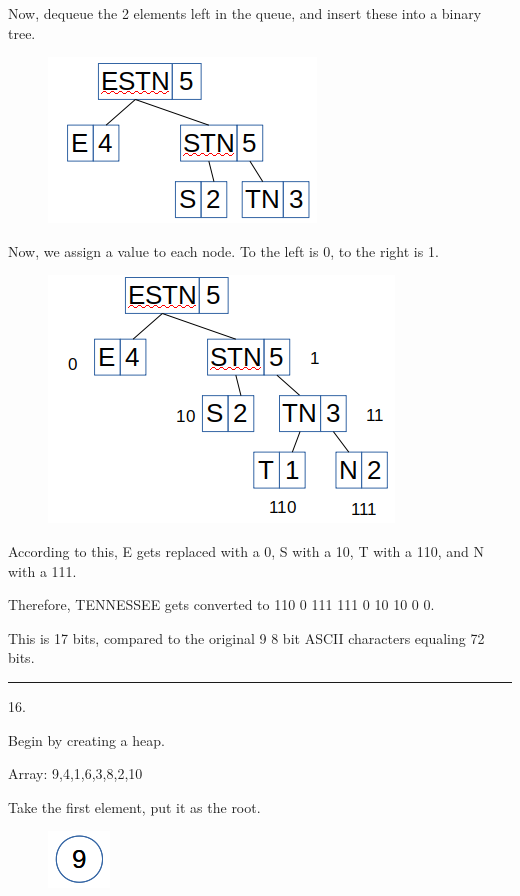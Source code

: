 \documentclass{article}
\begin{document}
Now, dequeue the 2 elements left in the queue, and insert these into a binary tree. 

\begin{figure}[H]
\includegraphics[scale=0.5]{./P15/ESTN}
\centering
\end{figure}

Now, we assign a value to each node. To the left is 0, to the right is 1. 


\begin{figure}[H]
\includegraphics[scale=0.5]{./P15/Scored}
\centering
\end{figure}

According to this, E gets replaced with a 0, S with a 10, T with a 110, and N with a 111. 

Therefore, TENNESSEE gets converted to 110 0 111 111 0 10 10 0 0. 

This is 17 bits, compared to the original 9 8 bit ASCII characters equaling 72 bits. 



\noindent\rule{8cm}{0.4pt}

16. 

Begin by creating a heap. 

Array: 9,4,1,6,3,8,2,10

Take the first element, put it as the root. 
\begin{figure}[H]
\includegraphics[scale=0.5]{./P16/0}
\centering
\end{figure}
\end{document}
